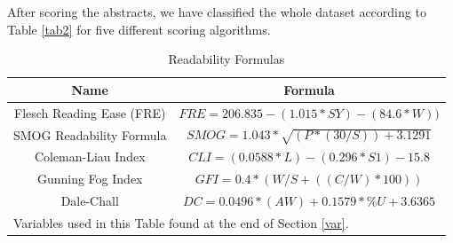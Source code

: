 \documentclass[conference]{IEEEtran}
\begin{document}
After scoring the abstracts, we have classified the whole dataset according to Table \ref{tab2} for five different scoring algorithms.

\begin{table}[htbp]
\caption{Readability Formulas \cite{b13}}
\begin{center}
\def\arraystretch{1.6}%
\begin{tabular}{|c|c|}
\hline
\textbf{Name}&\textbf{Formula} \\
\hline
Flesch Reading Ease (FRE) & $FRE = 206.835 - (1.015 * SY) - (84.6 * W))$  \\
\hline
SMOG Readability Formula & $SMOG = 1.043 * \sqrt{(P * (30/S)) + 3.1291}$  \\
\hline
Coleman-Liau Index & $CLI = (0.0588 * L) - (0.296 * S1) - 15.8$  \\
\hline
Gunning Fog Index & $GFI = 0.4 * (W/S + ((C/W) * 100))$  \\
\hline
Dale-Chall & $DC = 0.0496 * (AW) + 0.1579 * \%U+ 3.6365 $  \\
\hline
\multicolumn{2}{l}{Variables used in this Table found at the end of Section \ref{var}.}
\end{tabular}
\label{tab1}
\end{center}
\end{table}
\end{document}
